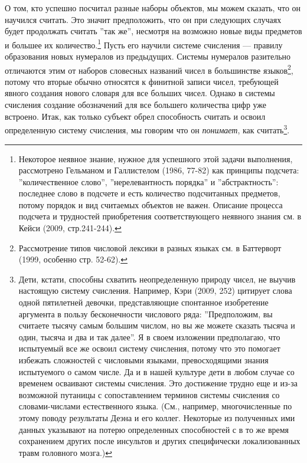 \documentclass[11pt]{book}
\begin{document}
О том, кто успешно посчитал разные наборы объектов, мы можем сказать, что он научился считать. Это значит предположить, что он при следующих случаях будет продолжать считать ''так же'', несмотря на возможно новые виды предметов и большее их количество.\footnote{Некоторое неявное знание, нужное для успешного этой задачи выполнения, рассмотрено Гельманом и Галлистелом (1986, 77-82) как принципы подсчета: ''количественное слово'', ''нерелевантность порядка'' и ''абстрактность'': последнее слово в подсчете и есть количество подсчитанных предметов, потому порядок и вид считаемых объектов не важен. Описание процесса подсчета и трудностей приобретения соответствующего неявного знания см. в Кейси (2009, стр.241-244).} Пусть его научили системе счисления --- правилу образования новых нумералов из предыдущих. Системы нумералов разительно отличаются этим от наборов словесных названий чисел в большинстве языков\footnote{Рассмотрение типов числовой лексики в разных языках см. в Баттерворт (1999, особенно стр. 52-62).}, потому что вторые обычно относятся к финитной записи чисел, требующей явного создания нового словаря для все больших чисел. Однако в системы счисления создание обозначений для все большего количества цифр уже встроено. Итак, как только субъект обрел способность считать и освоил определенную систему счисления, мы говорим что он \textit{понимает}, как считать\footnote{Дети, кстати, способны схватить неопределенную природу чисел, не выучив настоящую систему счисления. Например, Кэри (2009, 252) цитирует слова одной пятилетней девочки, представляющие спонтанное изобретение аргумента в пользу бесконечности числового ряда: ''Предположим, вы считаете тысячу самым большим числом, но вы же можете сказать тысяча и один, тысяча и два и так далее''. Я в своем изложении предполагаю, что испытуемый все же освоил систему счисления, потому что это помогает избежать сложностей с числовыми языками, превосходящими знания испытуемого о самом числе. Да и в нашей культуре дети в любом случае со временем осваивают системы счисления. Это достижение трудно еще и из-за возможной путаницы с сопоставлением терминов системы счисления со словами-числами естественного языка. (См., например, многочисленные по этому поводу результаты Деэна и его коллег. Некоторые из полученных ими данных указывают на потерю определенных способностей с в то же время сохранением других после инсультов и других специфически локализованных травм головного мозга.)}.
\end{document}
